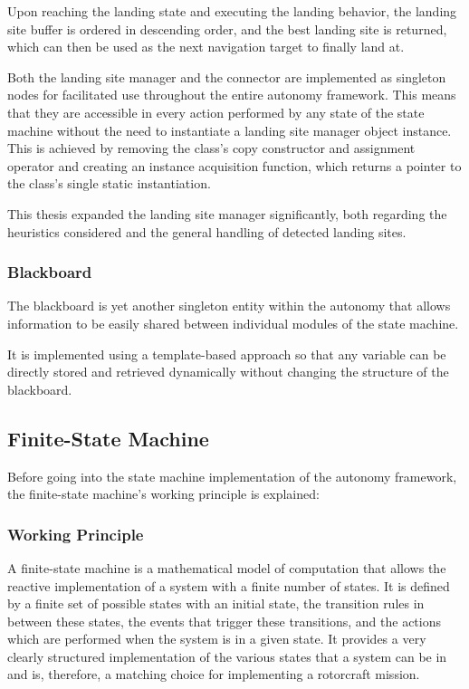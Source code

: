 \documentclass{article}
\begin{document}
Upon reaching the landing state and executing the landing behavior, the landing site buffer is ordered in descending order, and the best landing site is returned, which can then be used as the next navigation target to finally land at.

Both the landing site manager and the connector are implemented as singleton nodes for facilitated use throughout the entire autonomy framework. This means that they are accessible in every action performed by any state of the state machine without the need to instantiate a landing site manager object instance. This is achieved by removing the class's copy constructor and assignment operator and creating an instance acquisition function, which returns a pointer to the class's single static instantiation.

This thesis expanded the landing site manager significantly, both regarding the heuristics considered and the general handling of detected landing sites.

\subsubsection{Blackboard}\label{subsubsec:blackboard}

The blackboard is yet another singleton entity within the autonomy that allows information to be easily shared between individual modules of the state machine.

It is implemented using a template-based approach so that any variable can be directly stored and retrieved dynamically without changing the structure of the blackboard.

\subsection{Finite-State Machine}

Before going into the state machine implementation of the autonomy framework, the finite-state machine's working principle is explained:

\subsubsection{Working Principle}

A finite-state machine is a mathematical model of computation that allows the reactive implementation of a system with a finite number of states. It is defined by a finite set of possible states with an initial state, the transition rules in between these states, the events that trigger these transitions, and the actions which are performed when the system is in a given state. It provides a very clearly structured implementation of the various states that a system can be in and is, therefore, a matching choice for implementing a rotorcraft mission.
\end{document}
